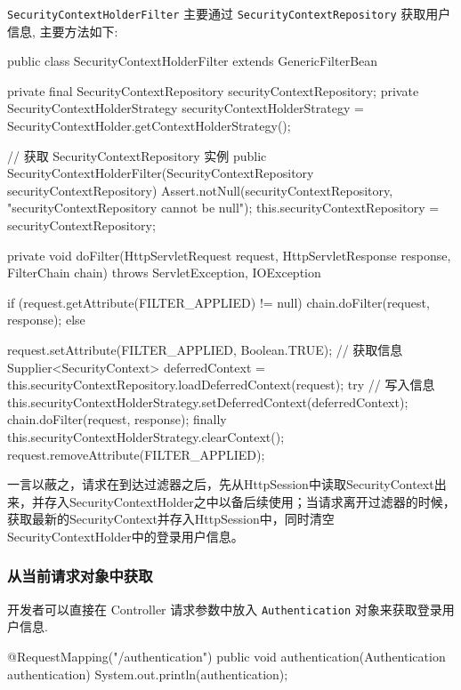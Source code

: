 \texttt{SecurityContextHolderFilter} 主要通过 \texttt{SecurityContextRepository} 获取用户信息, 主要方法如下:

\begin{Java}
public class SecurityContextHolderFilter extends GenericFilterBean {
    private final SecurityContextRepository securityContextRepository;
    private SecurityContextHolderStrategy securityContextHolderStrategy = SecurityContextHolder.getContextHolderStrategy();

    // 获取 SecurityContextRepository 实例
    public SecurityContextHolderFilter(SecurityContextRepository securityContextRepository) {
        Assert.notNull(securityContextRepository, "securityContextRepository cannot be null");
        this.securityContextRepository = securityContextRepository;
    }

    private void doFilter(HttpServletRequest request, HttpServletResponse response, FilterChain chain) throws ServletException, IOException {
        if (request.getAttribute(FILTER_APPLIED) != null) {
            chain.doFilter(request, response);
        } else {
          request.setAttribute(FILTER_APPLIED, Boolean.TRUE);
          // 获取信息
          Supplier<SecurityContext> deferredContext = this.securityContextRepository.loadDeferredContext(request);
          try {
              // 写入信息
              this.securityContextHolderStrategy.setDeferredContext(deferredContext);
              chain.doFilter(request, response);
          } finally {
              this.securityContextHolderStrategy.clearContext();
              request.removeAttribute(FILTER_APPLIED);
          }

        }
    }
}
\end{Java}

一言以蔽之，请求在到达过滤器之后，先从HttpSession中读取SecurityContext出来，并存入SecurityContextHolder之中以备后续使用；当请求离开过滤器的时候，获取最新的SecurityContext并存入HttpSession中，同时清空SecurityContextHolder中的登录用户信息。

\subsubsection{从当前请求对象中获取}

开发者可以直接在 Controller 请求参数中放入 \texttt{Authentication} 对象来获取登录用户信息. 

\begin{Java}
@RequestMapping("/authentication")
public void authentication(Authentication authentication) {
    System.out.println(authentication);
}
\end{Java}

